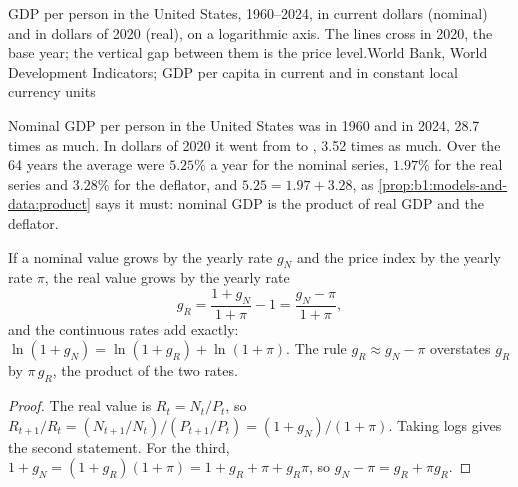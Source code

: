 \begin{omchart}{GDP per person in the United States, 1960--2024, in current
dollars (nominal) and in dollars of 2020 (real), on a logarithmic axis. The
lines cross in 2020, the base year; the vertical gap between them is the
price level.}{World Bank, World Development Indicators; GDP per capita in
current and in constant local currency units}
\end{omchart}

Nominal GDP per person in the United States was  in 1960 and
 in 2024, 28.7 times as much. %
In dollars of 2020 it went from  to , 3.52 times as
much. %
Over the 64 years the average  were $5.25\%$ a year
for the nominal series, $1.97\%$ for the real series and $3.28\%$ for the
deflator, and $5.25 = 1.97 + 3.28$, %
as \cref{prop:b1:models-and-data:product} says it must: nominal GDP is the
product of real GDP and the deflator.

\begin{proposition}\label{prop:b1:models-and-data:real-growth}
If a nominal value grows by the yearly rate $g_N$ and the price index by
the yearly rate $\pi$, the real value grows by the yearly rate
\[
g_R = \frac{1 + g_N}{1 + \pi} - 1 = \frac{g_N - \pi}{1 + \pi},
\]
and the continuous rates add exactly: $\ln(1 + g_N) = \ln(1 + g_R) + \ln(1 + \pi)$.
The rule $g_R \approx g_N - \pi$ overstates $g_R$ by $\pi\, g_R$, the
product of the two rates.
\end{proposition}

\begin{proof}
The real value is $R_t = N_t/P_t$, so
$R_{t+1}/R_t = (N_{t+1}/N_t)/(P_{t+1}/P_t) = (1 + g_N)/(1 + \pi)$.
Taking logs gives the second statement. For the third, $1 + g_N =
(1 + g_R)(1 + \pi) = 1 + g_R + \pi + g_R\pi$, so
$g_N - \pi = g_R + \pi g_R$.
\end{proof}

